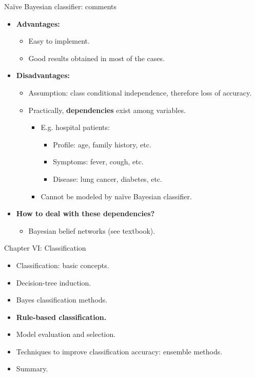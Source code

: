 \documentclass[aspectratio=169,t,table]{beamer}
\begin{document}
  {
    \begin{frame}{Naïve Bayesian classifier: comments}
      \begin{itemize}
        \item \textbf{Advantages:}
        \begin{itemize}
          \item Easy to implement.
          \item Good results obtained in most of the cases.
        \end{itemize}
        \item \textbf{Disadvantages:}
        \begin{itemize}
          \item Assumption: class conditional independence, therefore loss of accuracy.
          \item Practically, \textbf{dependencies} exist among variables.
          \begin{itemize}
            \item E.g. hospital patients:
            \begin{itemize}
              \item Profile: age, family history, etc.
              \item Symptoms: fever, cough, etc.
              \item Disease: lung cancer, diabetes, etc.
            \end{itemize}
            \item Cannot be modeled by naïve Bayesian classifier.
          \end{itemize}
        \end{itemize}
      \item \textbf{How to deal with these dependencies?}
      \begin{itemize}
        \item Bayesian belief networks (see textbook).
      \end{itemize}
      \end{itemize}
    \end{frame}
  }

  {
    \begin{frame}{Chapter VI: Classification}
        \begin{itemize}
            \item Classification: basic concepts.
            \item Decision-tree induction.
            \item Bayes classification methods.
            \item \textbf{Rule-based classification.}
            \item Model evaluation and selection.
            \item Techniques to improve classification accuracy: ensemble methods.
            \item Summary.
        \end{itemize}
    \end{frame}
  }
\end{document}
